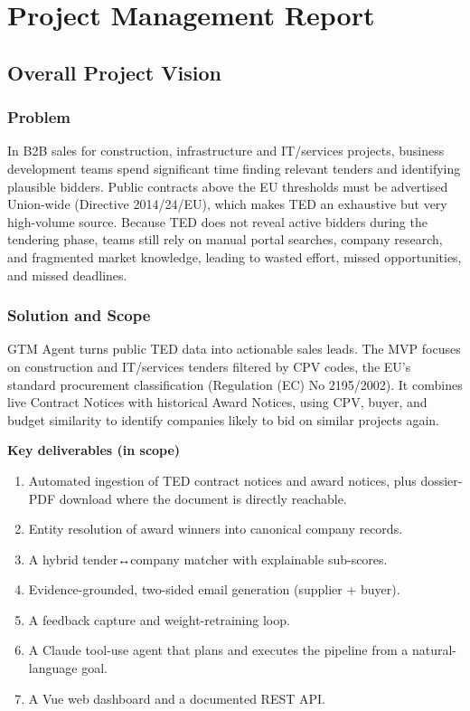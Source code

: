 \chapter{Project Management Report}

\section{Overall Project Vision}

\subsection{Problem}
In B2B sales for construction, infrastructure and IT/services projects, business
development teams spend significant time finding relevant tenders and identifying
plausible bidders. Public
contracts above the EU thresholds must be advertised Union-wide (Directive
2014/24/EU), which makes TED an exhaustive but very high-volume source.
Because TED does not reveal active bidders during the tendering phase, teams still
rely on manual portal searches, company research, and fragmented market knowledge,
leading to wasted effort, missed opportunities, and missed deadlines.

\subsection{Solution and Scope}
GTM Agent turns public TED data into actionable sales leads. The MVP focuses on
construction and IT/services tenders filtered by CPV codes, the EU's standard
procurement classification (Regulation (EC) No 2195/2002). It combines live
Contract Notices with historical Award Notices, using CPV, buyer, and budget
similarity to identify companies likely to bid on similar projects again.

\textbf{Key deliverables (in scope)}

\begin{enumerate}
\tightlist
\item Automated ingestion of TED contract notices and award notices, plus
  dossier-PDF download where the document is directly reachable.
\item Entity resolution of award winners into canonical company records.
\item A hybrid tender↔company matcher with explainable sub-scores.
\item Evidence-grounded, two-sided email generation (supplier + buyer).
\item A feedback capture and weight-retraining loop.
\item A Claude tool-use agent that plans and executes the pipeline from a
  natural-language goal.
\item A Vue web dashboard and a documented REST API.
\end{enumerate}


